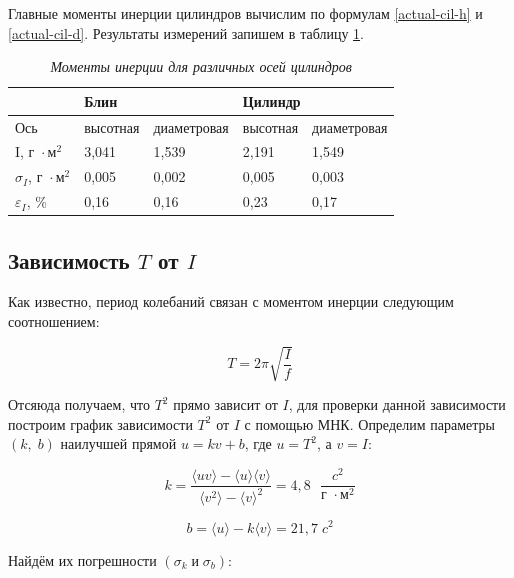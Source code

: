 \documentclass[a4paper, 12pt]{article}
\begin{document}
Главные моменты инерции цилиндров вычислим по формулам \eqref{actual-cil-h} и \eqref{actual-cil-d}. Результаты измерений запишем в таблицу \ref{cilinders-i}.

\begin{table}[!ht]
    \centering
    \begin{tabular}{|l|l|l|l|l|}
    \hline
        ~ & \multicolumn{2}{l|}{Блин} & \multicolumn{2}{l|}{Цилиндр} \\ \hline
        Ось & высотная & диаметровая & высотная & диаметровая \\ \hline
        I, $\text{г } \cdot \text{м}^2$ & 3,041 & 1,539 & 2,191 & 1,549 \\ \hline
        $\sigma_{I}$, $\text{г } \cdot \text{м}^2$ & 0,005 & 0,002 & 0,005 & 0,003 \\ \hline
        $\varepsilon_{I}$, $\%$ & 0,16 & 0,16 & 0,23 & 0,17 \\ \hline
    \end{tabular}\caption{\textit{Моменты инерции для различных осей цилиндров}}\label{cilinders-i}
\end{table}

\subsection{Зависимость $T$ от $I$}

Как известно, период колебаний связан с моментом инерции следующим соотношением:

\begin{equation}
    T = 2 \pi \sqrt{\frac{I}{f}}
\end{equation}

Отсяюда получаем, что $T^2$ прямо зависит от $I$, для проверки данной зависимости построим график зависимости $T^2$ от $I$ с помощью МНК. Определим параметры $(k,\;b)$  наилучшей прямой $u = kv + b$, где $u = T^2$, а $v = I$:

\begin{equation}
    k = \frac{\langle uv\rangle - \langle u \rangle \langle v \rangle}{\langle v^2 \rangle - \langle v \rangle^2} = 4,8 \text{ } \frac{c^2}{\text{г } \cdot \text{м}^2}
\end{equation}

\begin{equation}
    b = \langle u \rangle - k\langle v \rangle = 21,7\; c^2 
\end{equation}

Найдём их погрешности $(\sigma_k\;и\;\sigma_b)$:
\end{document}
